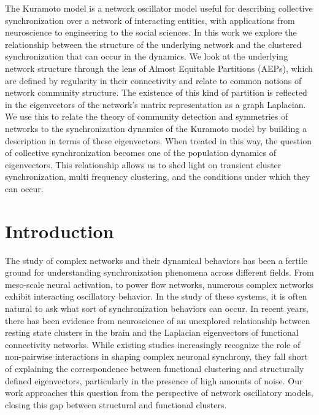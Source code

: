 \documentclass[%
 aip,
 amsmath,amssymb,
preprint,
reprint, onecolumn %
]{revtex4-1}
\begin{document}
The Kuramoto model is a network oscillator model useful for describing collective synchronization over a network of interacting entities, with applications from neuroscience to engineering to the social sciences. In this work we explore the relationship between the structure of the underlying network and the clustered synchronization that can occur in the dynamics. We look at the underlying network structure through the lens of Almost Equitable Partitions (AEPs), which are defined by regularity in their connectivity and relate to common notions of network community structure.
The existence of this kind of partition is reflected in the eigenvectors of the network’s matrix representation as a graph Laplacian. We use this to relate the theory of community detection and symmetries of networks to the synchronization dynamics of the Kuramoto model by building a description in terms of these eigenvectors. When treated in this way, the question of collective synchronization becomes one of the population dynamics of eigenvectors. This relationship allows us to shed light on transient cluster synchronization, multi frequency clustering, and the conditions under which they can occur. 



\section{Introduction\label{intro}}
The study of complex networks and their dynamical behaviors has been a fertile ground for understanding synchronization phenomena across different fields. From meso-scale neural activation, to power flow networks, numerous complex networks exhibit interacting oscillatory behavior. In the study of these systems, it is often natural to ask what sort of synchronization behaviors can occur. In recent years, there has been evidence from neuroscience of an unexplored relationship between resting state clusters in the brain and the Laplacian eigenvectors of functional connectivity networks.\cite{atasoy_human_2016} While existing studies increasingly recognize the role of non-pairwise interactions in shaping complex neuronal synchrony,\cite{majhi_patterns_2025} they fall short of explaining the correspondence between functional clustering and structurally defined eigenvectors, particularly in the presence of high amounts of noise. 
Our work approaches this question from the perspective of network oscillatory models, closing this gap between structural and functional clusters. 
\end{document}

